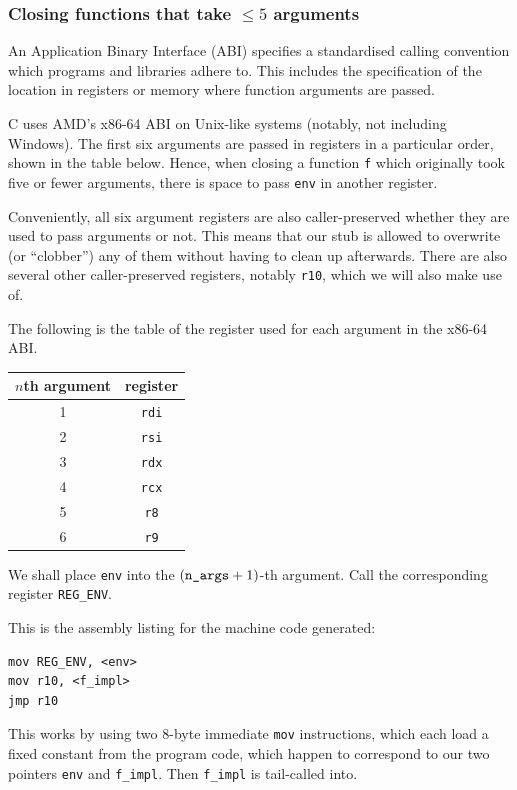 \documentclass[12pt,a4paper,twoside,openright]{report}
\begin{document}
\subsubsection{Closing functions that take $\le 5$ arguments}

An Application Binary Interface (ABI) specifies a standardised calling
convention which programs and libraries adhere to. This includes the
specification of the location in registers or memory where function arguments
are passed.

C uses AMD's x86-64 ABI on Unix-like systems (notably, not including Windows). The first
six arguments are passed in registers in a particular order,
shown in the table below. Hence, when closing a function \lstinline!f! which
originally took five or fewer arguments, there is space to pass \lstinline!env!
in another register.

Conveniently, all six argument registers are also caller-preserved whether they
are used to pass arguments or not. This means that our stub is allowed to
overwrite (or ``clobber'') any of them without having to clean up afterwards.
There are also several other caller-preserved registers, notably
\lstinline!r10!, which we will also make use of.

The following is the table of the register used for each argument in the x86-64
ABI.

\begin{center}
\begin{tabular}{ c | c }
  $n$th argument & register \\
  \hline
  1 & \lstinline!rdi! \\
  2 & \lstinline!rsi! \\
  3 & \lstinline!rdx! \\
  4 & \lstinline!rcx! \\
  5 & \lstinline!r8! \\
  6 & \lstinline!r9!
\end{tabular}
\end{center}

We shall place \lstinline!env! into the $(\text{\texttt{n\char`_args}}+1)$-th
argument. Call the corresponding register \lstinline!REG_ENV!.

This is the assembly listing for the machine code generated:

\begin{lstlisting}
mov REG_ENV, <env>
mov r10, <f_impl>
jmp r10
\end{lstlisting}

This works by using two 8-byte immediate \lstinline!mov! instructions, which
each load a fixed constant from the program code, which happen to correspond to
our two pointers \lstinline!env! and \lstinline!f_impl!.
Then \lstinline!f_impl! is tail-called into.
\end{document}
